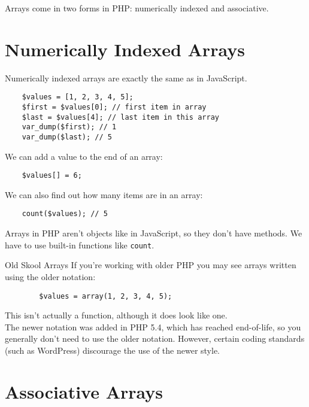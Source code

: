 Arrays come in two forms in PHP: numerically indexed and associative.
\\


\section{Numerically Indexed Arrays}

Numerically indexed arrays are exactly the same as in JavaScript.

\begin{verbatim}
    $values = [1, 2, 3, 4, 5];
    $first = $values[0]; // first item in array
    $last = $values[4]; // last item in this array
    var_dump($first); // 1
    var_dump($last); // 5
\end{verbatim}

We can add a value to the end of an array:

\begin{verbatim}
    $values[] = 6;
\end{verbatim}

We can also find out how many items are in an array:

\begin{verbatim}
    count($values); // 5
\end{verbatim}

Arrays in PHP aren't objects like in JavaScript, so they don't have methods. We have to use built-in functions like \texttt{count}.


\begin{infobox}{Old Skool Arrays}
    If you're working with older PHP you may see arrays written using the older notation:

    \begin{verbatim}
        $values = array(1, 2, 3, 4, 5);
    \end{verbatim}

    This isn't actually a function, although it does look like one.
    \\

    The newer notation was added in PHP 5.4, which has reached end-of-life, so you generally don't need to use the older notation. However, certain coding standards (such as WordPress) discourage the use of the newer style.
\end{infobox}

\section{Associative Arrays}

